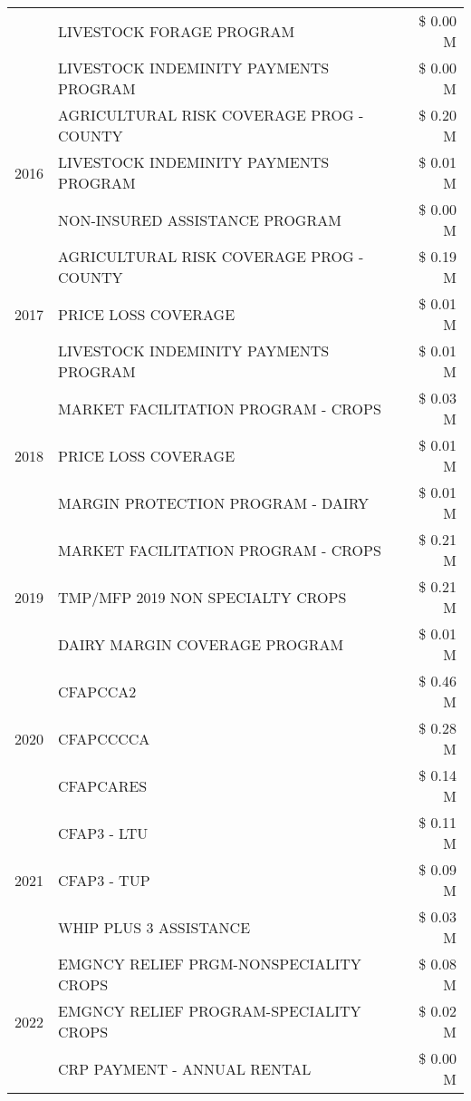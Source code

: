\begin{tabular}{llr}
 & LIVESTOCK FORAGE PROGRAM & \$ 0.00 M \\
 & LIVESTOCK INDEMINITY PAYMENTS PROGRAM & \$ 0.00 M \\
\cline{1-3}
\multirow[t]{3}{*}{2016} & AGRICULTURAL RISK COVERAGE PROG - COUNTY & \$ 0.20 M \\
 & LIVESTOCK INDEMINITY PAYMENTS PROGRAM & \$ 0.01 M \\
 & NON-INSURED ASSISTANCE PROGRAM & \$ 0.00 M \\
\cline{1-3}
\multirow[t]{3}{*}{2017} & AGRICULTURAL RISK COVERAGE PROG - COUNTY & \$ 0.19 M \\
 & PRICE LOSS COVERAGE & \$ 0.01 M \\
 & LIVESTOCK INDEMINITY PAYMENTS PROGRAM & \$ 0.01 M \\
\cline{1-3}
\multirow[t]{3}{*}{2018} & MARKET FACILITATION PROGRAM - CROPS & \$ 0.03 M \\
 & PRICE LOSS COVERAGE & \$ 0.01 M \\
 & MARGIN PROTECTION PROGRAM - DAIRY & \$ 0.01 M \\
\cline{1-3}
\multirow[t]{3}{*}{2019} & MARKET FACILITATION PROGRAM - CROPS & \$ 0.21 M \\
 & TMP/MFP 2019 NON SPECIALTY CROPS & \$ 0.21 M \\
 & DAIRY MARGIN COVERAGE PROGRAM & \$ 0.01 M \\
\cline{1-3}
\multirow[t]{3}{*}{2020} & CFAPCCA2 & \$ 0.46 M \\
 & CFAPCCCCA & \$ 0.28 M \\
 & CFAPCARES & \$ 0.14 M \\
\cline{1-3}
\multirow[t]{3}{*}{2021} & CFAP3 - LTU & \$ 0.11 M \\
 & CFAP3 - TUP & \$ 0.09 M \\
 & WHIP PLUS 3 ASSISTANCE & \$ 0.03 M \\
\cline{1-3}
\multirow[t]{3}{*}{2022} & EMGNCY RELIEF PRGM-NONSPECIALITY CROPS & \$ 0.08 M \\
 & EMGNCY RELIEF PROGRAM-SPECIALITY CROPS & \$ 0.02 M \\
 & CRP PAYMENT - ANNUAL RENTAL & \$ 0.00 M \\
\cline{1-3}
\bottomrule
\end{tabular}
